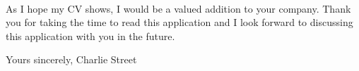 \documentclass[12pt]{article}
\begin{document}
\begin{flushleft}
		\paragraph{}
			As I hope my CV shows, I would be a valued addition to your company. Thank you for taking the time to read this application and I look forward to discussing this application with you in the future.\\

		
	\end{flushleft}

	\begin{flushleft}
		Yours sincerely,
		\newline
		\break
		Charlie Street
	\end{flushleft}
\end{document}
